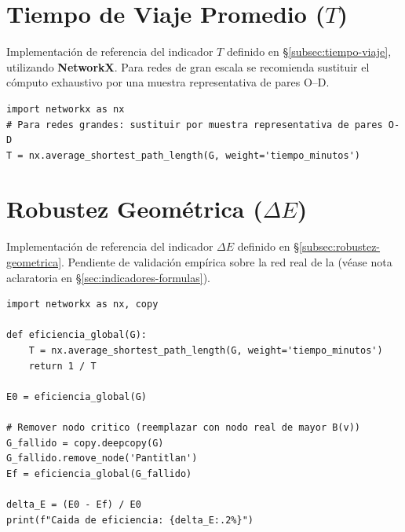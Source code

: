 \section{Tiempo de Viaje Promedio \texorpdfstring{($T$)}{(T)}}
\label{anx:impl-tiempo}

Implementación de referencia del indicador $T$ definido en
§\ref{subsec:tiempo-viaje}, utilizando \textbf{NetworkX}. Para redes de gran
escala se recomienda sustituir el cómputo exhaustivo por una muestra
representativa de pares O--D.

\begin{lstlisting}[style=estiloPython,
  caption={Cálculo del Tiempo de Viaje Promedio $T$ con NetworkX (prototipo).},
  label={lst:tiempo}]
import networkx as nx
# Para redes grandes: sustituir por muestra representativa de pares O-D
T = nx.average_shortest_path_length(G, weight='tiempo_minutos')
\end{lstlisting}

\section{Robustez Geométrica \texorpdfstring{($\Delta E$)}{(Delta E)}}
\label{anx:impl-robustez}

Implementación de referencia del indicador $\Delta E$ definido en
§\ref{subsec:robustez-geometrica}. Pendiente de validación empírica sobre la red
real de la \zmvm{} (véase nota aclaratoria en §\ref{sec:indicadores-formulas}).

\begin{lstlisting}[style=estiloPython,
  caption={Cálculo de Robustez Geométrica $\Delta E$ con NetworkX (prototipo).},
  label={lst:robustez}]
import networkx as nx, copy

def eficiencia_global(G):
    T = nx.average_shortest_path_length(G, weight='tiempo_minutos')
    return 1 / T

E0 = eficiencia_global(G)

# Remover nodo critico (reemplazar con nodo real de mayor B(v))
G_fallido = copy.deepcopy(G)
G_fallido.remove_node('Pantitlan')
Ef = eficiencia_global(G_fallido)

delta_E = (E0 - Ef) / E0
print(f"Caida de eficiencia: {delta_E:.2%}")
\end{lstlisting}

